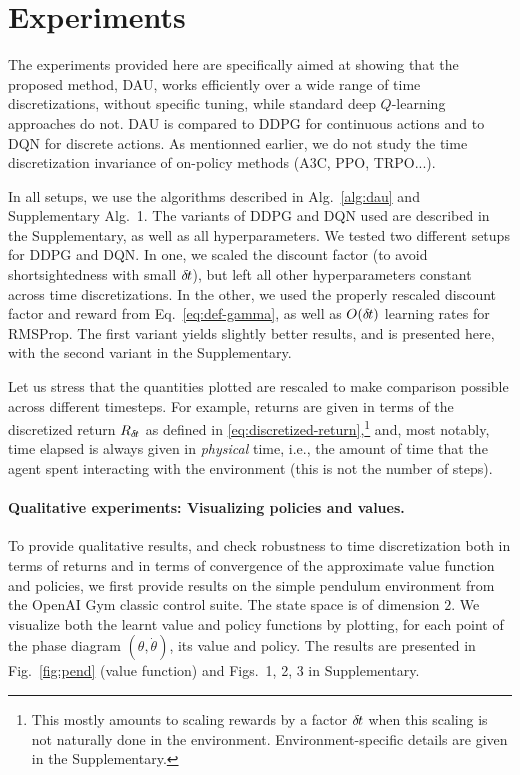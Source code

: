 \section{Experiments}
\label{sec:exp}

The experiments provided here are specifically aimed at showing that
the proposed method, DAU, works efficiently over a wide range of time
discretizations, without specific tuning, while standard deep $Q$-learning
approaches do not. DAU is compared to DDPG for continuous actions and to DQN
for discrete actions.  As mentionned earlier, we do not study the time
discretization invariance of on-policy methods (A3C, PPO, TRPO...).

In all setups, we use the algorithms described in
Alg.~\ref{alg:dau} and Supplementary Alg.~1. The variants of DDPG and DQN
used are described in the Supplementary, as well as all hyperparameters. We tested two different setups for DDPG and DQN.
In one, we scaled the discount factor (to avoid shortsightedness with small ${\delta\hspace{-.1em}t}$), but
left all other hyperparameters constant across time discretizations.
In the other, we used the properly rescaled discount
factor and reward from Eq.~\eqref{eq:def-gamma},
as well as $O({\delta\hspace{-.1em}t})$ learning rates for RMSProp.  The first variant yields slightly
better results, and is presented here, with the second variant in the
Supplementary.

Let us stress that the quantities plotted are rescaled to make comparison
possible across different timesteps. For example,
returns are given in terms of the discretized return $R_{\delta\hspace{-.1em}t}$ as defined in \eqref{eq:discretized-return},\footnote{This mostly amounts to scaling rewards
by a factor ${\delta\hspace{-.1em}t}$ when this scaling is not naturally done in the environment. Environment-specific
details are given in the Supplementary.} and, most notably, time elapsed is always given in
\emph{physical} time, i.e., the amount of time that the agent spent
interacting with the environment (this is not the number of steps).


\paragraph{Qualitative experiments: Visualizing policies and values.}
To provide qualitative results, and check robustness to time
discretization both in terms of returns and in terms
of convergence of the approximate value function and policies, we first provide results on the simple pendulum environment
from the OpenAI Gym classic control suite.  The state space is of
dimension $2$. We visualize both the learnt value and policy functions by
plotting, for each point of the phase diagram $(\theta, \dot{\theta})$,
its value and policy. The results are presented in
Fig.~\ref{fig:pend} (value function) and Figs.~1, 2,  3 in
Supplementary.

